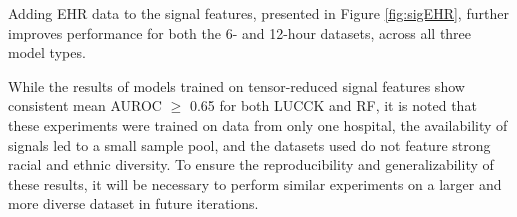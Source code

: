 Adding EHR data to the signal features, presented in Figure \ref{fig:sigEHR}, further improves performance for both the 6- and 12-hour datasets, across all three model types.

While the results of models trained on tensor-reduced signal features show consistent mean AUROC $\geq$ 0.65 for both LUCCK and RF, it is noted that these experiments were trained on data from only one hospital, the availability of signals led to a small sample pool, and the datasets used do not feature strong racial and ethnic diversity. To ensure the reproducibility and generalizability of these results, it will be necessary to perform similar experiments on a larger and more diverse dataset in future iterations.

